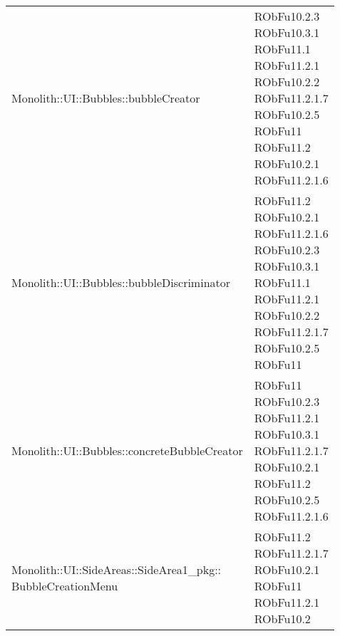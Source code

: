 \begin{center}
\begin{longtable}{|
*{1}{>{\centering\arraybackslash}m{7.5cm}|}
*{1}{>{\centering\arraybackslash}m{2.5cm}|}}
{\\RObFu11
\\RObFu11.2.1
\\RObFu11.2.1.7
\\}\\\hline
Monolith::UI::Bubbles::bubbleCreator & \makecell{RObFu10.2.3
\\RObFu10.3.1
\\RObFu11.1
\\RObFu11.2.1
\\RObFu10.2.2
\\RObFu11.2.1.7
\\RObFu10.2.5
\\RObFu11
\\RObFu11.2
\\RObFu10.2.1
\\RObFu11.2.1.6
\\}\\\hline
Monolith::UI::Bubbles::bubbleDiscriminator & \makecell{RObFu11.2
\\RObFu10.2.1
\\RObFu11.2.1.6
\\RObFu10.2.3
\\RObFu10.3.1
\\RObFu11.1
\\RObFu11.2.1
\\RObFu10.2.2
\\RObFu11.2.1.7
\\RObFu10.2.5
\\RObFu11
\\}\\\hline
Monolith::UI::Bubbles::concreteBubbleCreator & \makecell{RObFu11
\\RObFu10.2.3
\\RObFu11.2.1
\\RObFu10.3.1
\\RObFu11.2.1.7
\\RObFu10.2.1
\\RObFu11.2
\\RObFu10.2.5
\\RObFu11.2.1.6
\\}\\\hline
\makecell[l]{Monolith::UI::SideAreas::SideArea1\_pkg:: \\ \hfill BubbleCreationMenu} & \makecell{RObFu11.2
\\RObFu11.2.1.7
\\RObFu10.2.1
\\RObFu11
\\RObFu11.2.1
\\RObFu10.2
}
\end{longtable}
\end{center}
